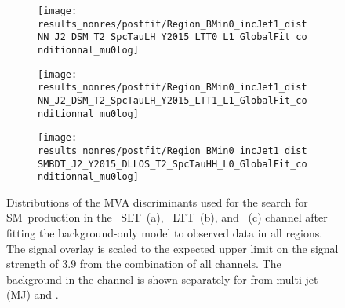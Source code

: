 \begin{figure}[htbp]
  \centering

  \begin{subfigure}{0.495\textwidth}
    \centering

    \texttt{[image: results\_nonres/postfit/Region\_BMin0\_incJet1\_distNN\_J2\_DSM\_T2\_SpcTauLH\_Y2015\_LTT0\_L1\_GlobalFit\_conditionnal\_mu0log]}

  \end{subfigure}\hfill%
  \begin{subfigure}{0.495\textwidth}
    \centering

    \texttt{[image: results\_nonres/postfit/Region\_BMin0\_incJet1\_distNN\_J2\_DSM\_T2\_SpcTauLH\_Y2015\_LTT1\_L1\_GlobalFit\_conditionnal\_mu0log]}

  \end{subfigure}

  \vspace{0.5em}

  \begin{subfigure}{0.495\textwidth}
    \centering

    \texttt{[image: results\_nonres/postfit/Region\_BMin0\_incJet1\_distSMBDT\_J2\_Y2015\_DLLOS\_T2\_SpcTauHH\_L0\_GlobalFit\_conditionnal\_mu0log]}

  \end{subfigure}

  \caption[Distributions of the MVA discriminants used for the search for SM~\HH
  production after the background-only fit.]{Distributions of the MVA
    discriminants used for the search for SM~\HH production in the
    \lephad~SLT~(a), \lephad~LTT~(b), and \hadhad~(c) channel after fitting the
    background-only model to observed data in all regions. The signal overlay is
    scaled to the expected upper limit on the signal strength of $3.9$ from the
    combination of all channels. The \faketauhadvis background in the \hadhad
    channel is shown separately for \faketauhadvis from multi-jet (MJ) and
    \ttbar.}%
  \label{fig:mvascores_postfit}
\end{figure}

